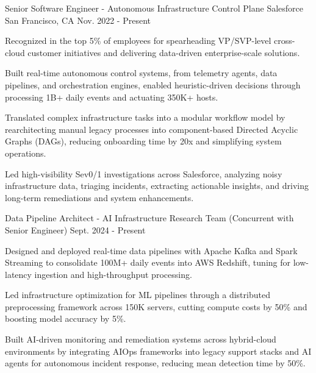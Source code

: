 

\renewcommand{\baselinestretch}{1.4} 
\begin{cventries}
  \cventry
    {Senior Software Engineer - Autonomous Infrastructure Control Plane}
    {Salesforce}
    {San Francisco, CA}
    {Nov. 2022 - Present}
    {
      \begin{cvitems}
        \item {Recognized in the top 5\% of employees for spearheading VP/SVP-level cross-cloud customer initiatives and delivering data-driven enterprise-scale solutions.}
        \item {Built real-time autonomous control systems, from telemetry agents, data pipelines, and orchestration engines, enabled heuristic-driven decisions through processing 1B+ daily events and actuating 350K+ hosts.}
        \item {Translated complex infrastructure tasks into a modular workflow model by rearchitecting manual legacy processes into component-based Directed Acyclic Graphs (DAGs), reducing onboarding time by 20x and simplifying system operations.}
        \item {Led high-visibility Sev0/1 investigations across Salesforce, analyzing noisy infrastructure data, triaging incidents, extracting actionable insights, and driving long-term remediations and system enhancements.}
      \end{cvitems}
    }

  \cventry
    {Data Pipeline Architect - AI Infrastructure Research Team \linebreak(Concurrent with Senior Engineer)}
    {}
    {}
    {Sept. 2024 - Present}
    {
      \begin{cvitems}
        \item {Designed and deployed real-time data pipelines with Apache Kafka and Spark Streaming to consolidate 100M+ daily events into AWS Redshift, tuning for low-latency ingestion and high-throughput processing.}
        \item {Led infrastructure optimization for ML pipelines through a distributed preprocessing framework across 150K servers, cutting compute costs by 50\% and boosting model accuracy by 5\%.}
        \item {Built AI-driven monitoring and remediation systems across hybrid-cloud environments by integrating AIOps frameworks into legacy support stacks and AI agents for autonomous incident response, reducing mean detection time by 50\%.}
      \end{cvitems}
    }


\end{cventries}
